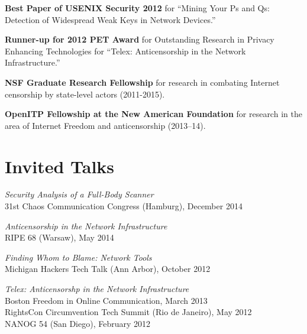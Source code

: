 \documentclass[margin,11pt]{res} %
\begin{document}
    \textbf{Best Paper of USENIX Security 2012}
    for ``Mining Your Ps and Qs: Detection of Widespread Weak Keys in Network Devices.''

    \textbf{Runner-up for 2012 PET Award} for Outstanding Research in Privacy Enhancing Technologies for ``Telex: Anticensorship in the Network Infrastructure.''


    \textbf{NSF Graduate Research Fellowship}
    for research in combating Internet censorship by state-level actors (2011-2015).
    
    \textbf{OpenITP Fellowship at the New American Foundation}
    for research in the area of Internet Freedom and anticensorship (2013--14).

\vspace{6pt}
\section{\large Invited Talks}

\emph{Security Analysis of a Full-Body Scanner} \\
    31st Chaos Communication Congress (Hamburg), December 2014

\emph{Anticensorship in the Network Infrastructure} \\
    RIPE 68 (Warsaw), May 2014


\emph{Finding Whom to Blame: Network Tools} \\
    Michigan Hackers Tech Talk (Ann Arbor), October 2012
    
\emph{Telex: Anticensorshp in the Network Infrastructure} \\
    Boston Freedom in Online Communication, March 2013\\
    RightsCon Circumvention Tech Summit (Rio de Janeiro), May 2012 \\
    NANOG 54 (San Diego), February 2012 %

\end{document}
